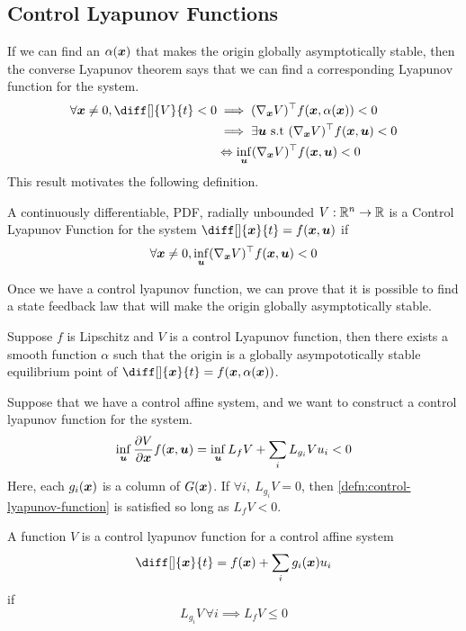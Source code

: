 \subsection{Control Lyapunov Functions}
If we can find an $\alpha(\boldsymbol{x})$ that makes the origin globally asymptotically
stable, then the converse Lyapunov theorem says that we can find a
corresponding Lyapunov function for the system.
\begin{align*}
	\forall \bs{x} \neq 0, \diff[]{V}{t} < 0 &\implies (\nabla_{\bs{x}}V)^\top f(\bs{x}, \alpha(\bs{x})) < 0 \\
	&\implies \exists \bs{u} \text{ s.t } (\nabla_{\bs{x}}V)^\top f(\bs{x},
	\bs{u}) < 0\\
	& \Leftrightarrow \inf_{\bs{u}} (\nabla_{\bs{x}}V)^\top f(\bs{x}, \bs{u}) < 0
\end{align*}
This result motivates the following definition.
\begin{definition}
	A continuously differentiable, PDF, radially unbounded $V: \mathbb{R}^n \to \mathbb{R}$ is a
	Control Lyapunov Function for the system $\diff[]{\bs{x}}{t} = f(\bs{x},
	\bs{u})$ if \[
		\forall \boldsymbol{x} \neq 0, \inf_{\boldsymbol{u}} (\nabla_{\boldsymbol{x}}V)^\top
		f(\boldsymbol{x}, \boldsymbol{u}) < 0
	\]
	\label{defn:control-lyapunov-function}
\end{definition}
Once we have a control lyapunov function, we can prove that it is possible to
find a state feedback law that will make the origin globally asymptotically
stable.
\begin{theorem}
	Suppose $f$ is Lipschitz and $V$ is a control Lyapunov function, then there
	exists a smooth function $\alpha$ such that the origin is a globally
	asympototically stable equilibrium point of $\diff[]{\bs{x}}{t} = f(\bs{x},
	\alpha(\bs{x}))$.
	\label{thm:artstein}
\end{theorem}
Suppose that we have a control affine system, and we want to construct a control
lyapunov function for the system. \[
	\inf_{\boldsymbol{u}} \frac{\partial V}{\partial \boldsymbol{x}}f(\boldsymbol{x}, \boldsymbol{u}) =
	\inf_{\boldsymbol{u}} L_f V + \sum_i L_{g_i} V u_i < 0
\]
Here, each $g_i(\boldsymbol{x})$ is a column of $G(\boldsymbol{x})$.
If $\forall i,\ L_{g_i} V = 0$, then \cref{defn:control-lyapunov-function} is
satisfied so long as $L_f V < 0$.
\begin{theorem}
	A function $V$ is a control lyapunov function for a control affine system \[
		\diff[]{\bs{x}}{t} = f(\bs{x}) + \sum_i g_i(\bs{x}) u_i
	\] if \[
		L_{g_i} V\, \forall i \implies L_f V \leq 0
	\]
	\label{thm:control-affine-lyap}
\end{theorem}
